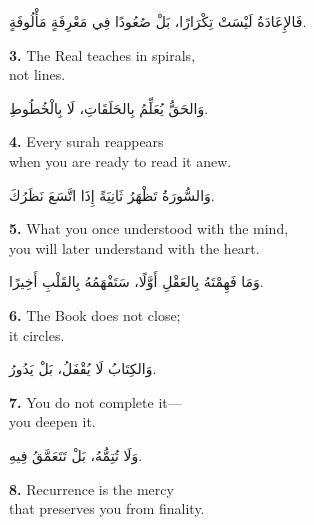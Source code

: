 \documentclass[11pt,a4paper,twoside]{book}
\begin{document}
\begin{flushright}
{\arabicfont
فَالإِعَادَةُ لَيْسَتْ تِكْرَارًا،
بَلْ صُعُودًا فِي مَعْرِفَةٍ مَأْلُوفَةٍ.}
\end{flushright}

\vspace{1em}
{\color{indigo}\bfseries 3.}\quad
The Real teaches in spirals,\\
not lines.

\begin{flushright}
{\arabicfont
وَالحَقُّ يُعَلِّمُ بِالحَلَقَاتِ،
لَا بِالْخُطُوطِ.}
\end{flushright}

\vspace{1em}
{\color{indigo}\bfseries 4.}\quad
Every surah reappears\\
when you are ready to read it anew.

\begin{flushright}
{\arabicfont
وَالسُّورَةُ تَظْهَرُ ثَانِيَةً
إِذَا اتَّسَعَ نَظَرُكَ.}
\end{flushright}

\vspace{1em}
{\color{indigo}\bfseries 5.}\quad
What you once understood with the mind,\\
you will later understand with the heart.

\begin{flushright}
{\arabicfont
وَمَا فَهِمْتَهُ بِالعَقْلِ أَوَّلًا،
سَتَفْهَمُهُ بِالقَلْبِ أَخِيرًا.}
\end{flushright}

\vspace{1em}
{\color{indigo}\bfseries 6.}\quad
The Book does not close;\\
it circles.

\begin{flushright}
{\arabicfont
وَالكِتَابُ لَا يُقْفَلُ،
بَلْ يَدُورُ.}
\end{flushright}

\vspace{1em}
{\color{indigo}\bfseries 7.}\quad
You do not complete it—\\
you deepen it.

\begin{flushright}
{\arabicfont
وَلَا تُتِمُّهُ،
بَلْ تَتَعَمَّقُ فِيهِ.}
\end{flushright}

\vspace{1em}
{\color{indigo}\bfseries 8.}\quad
Recurrence is the mercy\\
that preserves you from finality.
\end{document}
